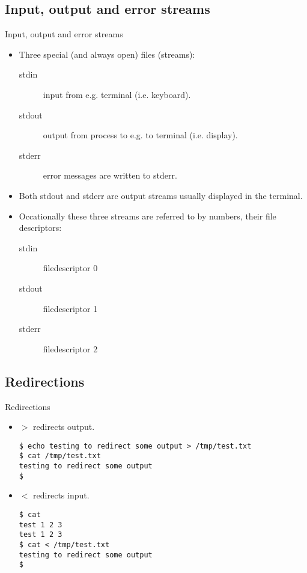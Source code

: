 \documentclass[handout]{beamer}
\begin{document}
\subsection{Input, output and error streams}
\begin{frame}{Input, output and error streams}
	\begin{itemize}
		\item<1-> Three special (and always open) files (streams):
			\begin{description}
				\item[stdin] input from e.g. terminal (i.e. keyboard).
				\item[stdout] output from process to e.g. to terminal (i.e.  display).
				\item[stderr] error messages are written to stderr.
			\end{description}
		\item<2> Both stdout and stderr are output streams usually displayed in the 
			terminal.
		\item<3> Occationally these three streams are referred to by numbers, their 
			file descriptors:
			\begin{description}
				\item[stdin] filedescriptor 0
				\item[stdout] filedescriptor 1
				\item[stderr] filedescriptor 2
			\end{description}
	\end{itemize}
\end{frame}

\subsection{Redirections}
\begin{frame}[fragile]{Redirections}
	\begin{itemize}
		\item<1> $>$ redirects output.
			\begin{lstlisting}
$ echo testing to redirect some output > /tmp/test.txt
$ cat /tmp/test.txt
testing to redirect some output
$
			\end{lstlisting}
		\item<2> $<$ redirects input.
			\begin{lstlisting}
$ cat
test 1 2 3
test 1 2 3
$ cat < /tmp/test.txt
testing to redirect some output
$
			\end{lstlisting}
	\end{itemize}
\end{frame}
\end{document}
